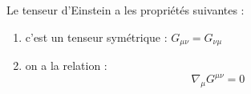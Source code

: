 \documentclass[a4paper,11pt]{report}
\begin{document}
        \begin{prop}\begin{leftbar}
            Le tenseur d'Einstein a les propriétés suivantes :
            \begin{enumerate}[label = \textit{\roman*)}]
                \item c'est un tenseur symétrique : $G_{\mu\nu} = G_{\nu\mu}$
                \item on a la relation :
                \begin{equation}
                    \nabla_\mu G^{\mu\nu} = 0
                \end{equation}
            \end{enumerate}
        \end{leftbar}\end{prop}
        
\end{document}
